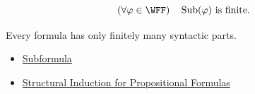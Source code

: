 \begin{remark*}
\[
(\forall\varphi\in\WFF)\quad
\operatorname{Sub}(\varphi)\text{ is finite}.
\]
\end{remark*}

\begin{remark*}[Interpretation]
Every formula has only finitely many syntactic parts.
\end{remark*}

\begin{dependencies}
\begin{itemize}
  \item \hyperref[def:subformula-propositional-logic]{Subformula}
  \item \hyperref[thm:structural-induction-propositional-formulas]{Structural Induction for Propositional Formulas}
\end{itemize}
\end{dependencies}
